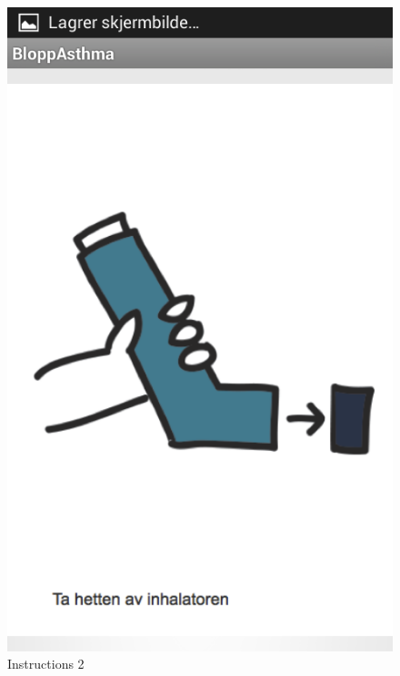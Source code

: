 \begin{figure}[H]
\begin{minipage}[b]{0.3\linewidth}
		\includegraphics[width=0.20\paperwidth]{Pictures/app-screenshots/instructions-2.png}
		\caption{Instructions 2}
		\label{fig:instructions-2}
	\end{minipage}
	\begin{minipage}[b]{0.3\linewidth}
		\centering

\end{minipage}
\end{figure}
